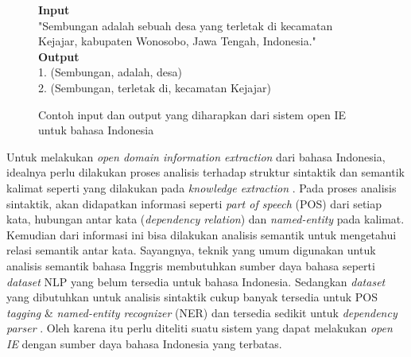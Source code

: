\begin{figure}
	\begin{mdframed}
		\textbf{Input} \\
		"Sembungan adalah sebuah desa yang terletak di kecamatan Kejajar, kabupaten Wonosobo, Jawa Tengah, Indonesia." \\
		
		\textbf{Output} \\
		1. (Sembungan, adalah, desa) \\
		2. (Sembungan, terletak di, kecamatan Kejajar)
	\end{mdframed}
	\caption{Contoh input dan output yang diharapkan dari sistem open IE untuk bahasa Indonesia}
	\label{fig:example_io_openie}
\end{figure}

Untuk melakukan \textit{open domain information extraction} dari bahasa Indonesia, idealnya perlu dilakukan proses analisis terhadap struktur sintaktik dan semantik kalimat seperti yang dilakukan pada \textit{knowledge extraction} \citep{exner2014refractive}. Pada proses analisis sintaktik, akan didapatkan informasi seperti \textit{part of speech} (POS) dari setiap kata, hubungan antar kata (\textit{dependency relation}) dan \textit{named-entity} pada kalimat. Kemudian dari informasi ini bisa dilakukan analisis semantik untuk mengetahui relasi semantik antar kata. Sayangnya, teknik yang umum digunakan untuk analisis semantik bahasa Inggris membutuhkan sumber daya bahasa seperti \textit{dataset} NLP yang belum tersedia untuk bahasa Indonesia. Sedangkan \textit{dataset} yang dibutuhkan untuk analisis sintaktik cukup banyak tersedia untuk POS \textit{tagging} \citep{wicaksono2010hmm} \& \textit{named-entity recognizer} (NER) \citep{fader2011identifying} dan tersedia sedikit untuk \textit{dependency parser} \citep{nivre2016universal}. Oleh karena itu perlu diteliti suatu sistem yang dapat melakukan \textit{open IE} dengan sumber daya bahasa Indonesia yang terbatas.


